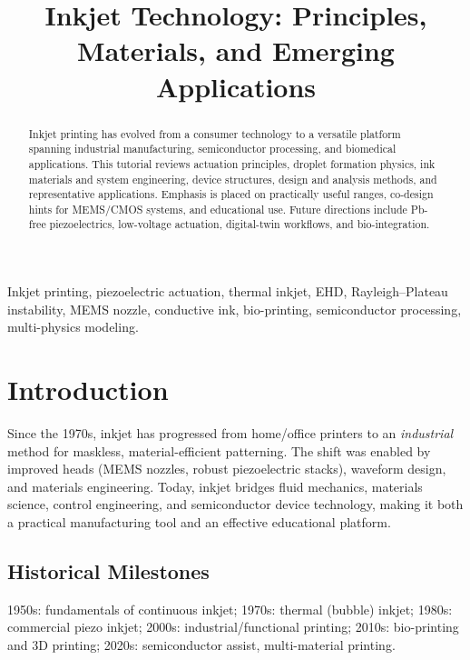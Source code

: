 \documentclass[conference]{IEEEtran}
\title{Inkjet Technology: Principles, Materials, and Emerging Applications}
\author{
\IEEEauthorblockN{Shinichi Samizo}
\IEEEauthorblockA{Independent Semiconductor Researcher\\
Project Design Hub, Samizo-AITL\\
\textit{Email:} \href{mailto:shin3t72@gmail.com}{shin3t72@gmail.com}\quad
\textit{GitHub:} \href{https://github.com/Samizo-AITL}{Samizo-AITL}}
}
\begin{document}
\maketitle

\begin{abstract}
Inkjet printing has evolved from a consumer technology to a versatile platform spanning industrial manufacturing, semiconductor processing, and biomedical applications. This tutorial reviews actuation principles, droplet formation physics, ink materials and system engineering, device structures, design and analysis methods, and representative applications. Emphasis is placed on practically useful ranges, co-design hints for MEMS/CMOS systems, and educational use. Future directions include Pb-free piezoelectrics, low-voltage actuation, digital-twin workflows, and bio-integration.
\end{abstract}

\begin{IEEEkeywords}
Inkjet printing, piezoelectric actuation, thermal inkjet, EHD, Rayleigh--Plateau instability, MEMS nozzle, conductive ink, bio-printing, semiconductor processing, multi-physics modeling.
\end{IEEEkeywords}

\FloatBarrier

\section{Introduction}
Since the 1970s, inkjet has progressed from home/office printers to an \emph{industrial} method for maskless, material-efficient patterning. The shift was enabled by improved heads (MEMS nozzles, robust piezoelectric stacks), waveform design, and materials engineering. Today, inkjet bridges fluid mechanics, materials science, control engineering, and semiconductor device technology, making it both a practical manufacturing tool and an effective educational platform.

\subsection{Historical Milestones}
1950s: fundamentals of continuous inkjet; 1970s: thermal (bubble) inkjet; 1980s: commercial piezo inkjet; 2000s: industrial/functional printing; 2010s: bio-printing and 3D printing; 2020s: semiconductor assist, multi-material printing.
\end{document}

